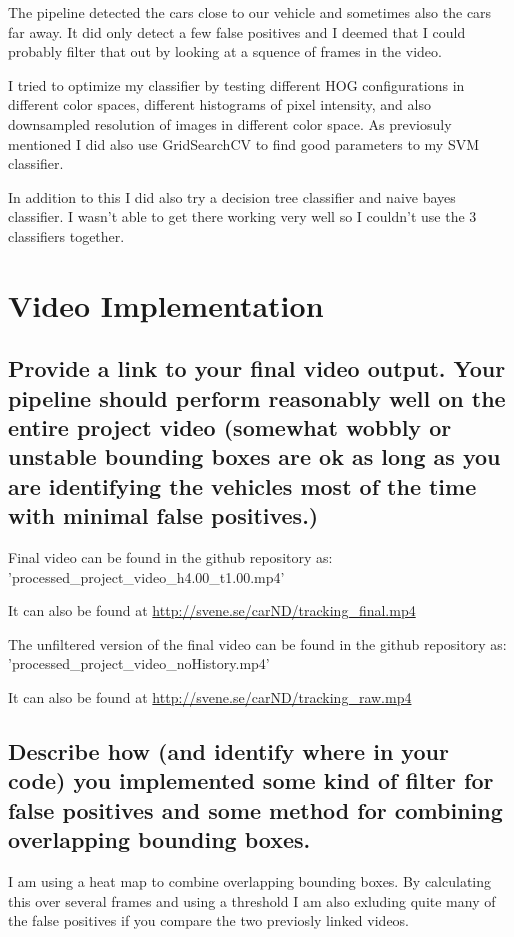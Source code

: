 \documentclass[12pt,a4paper]{article}
\begin{document}
The pipeline detected the cars close to our vehicle and sometimes also the cars far away. It did only detect a few false positives and I deemed that I could probably filter that out by looking at a squence of frames in the video.

I tried to optimize my classifier by testing different HOG configurations in different color spaces, different histograms of pixel intensity, and also downsampled resolution of images in different color space. As previosuly mentioned I did also use GridSearchCV to find good parameters to my SVM classifier.

In addition to this I did also try a decision tree classifier and naive bayes classifier. I wasn't able to get there working very well so I couldn't use the 3 classifiers together.
\section{Video Implementation}

\subsection{Provide a link to your final video output. Your pipeline should perform reasonably well on the entire project video (somewhat wobbly or unstable bounding boxes are ok as long as you are identifying the vehicles most of the time with minimal false positives.)}
Final video can be found in the github repository as: \\
'processed\_project\_video\_h4.00\_t1.00.mp4'

It can also be found at \url{http://svene.se/carND/tracking\_final.mp4}

The unfiltered version of the final video can be found in the github repository as: \\
'processed\_project\_video\_noHistory.mp4'

It can also be found at \url{http://svene.se/carND/tracking\_raw.mp4}

\subsection{Describe how (and identify where in your code) you implemented some kind of filter for false positives and some method for combining overlapping bounding boxes.}
I am using a heat map to combine overlapping bounding boxes. By calculating this over several frames and using a threshold I am also exluding quite many of the false positives if you compare the two previosly linked videos.
\end{document}
